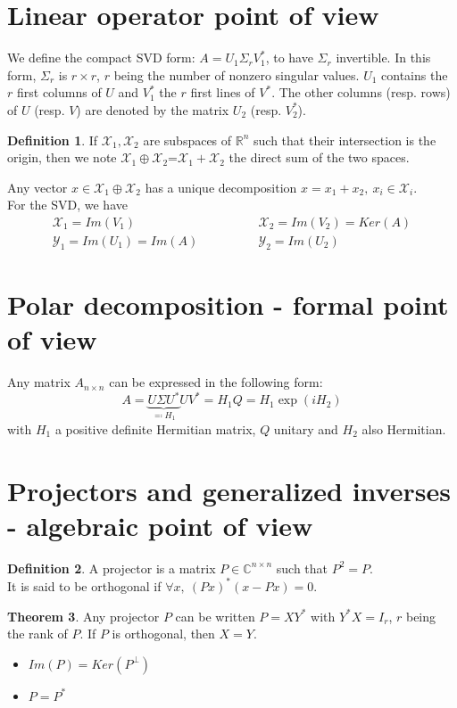 \documentclass[12pt, openany]{report}
\theoremstyle{definition}
\newtheorem{thm}{Theorem}[chapter]
\newtheorem{definition}[thm]{Definition}
\newcommand{\R}{\mathbb{R}}
\newcommand{\C}{\mathbb{C}}
\begin{document}
\section{Linear operator point of view}
We define the compact SVD form: \(A=U_1\Sigma_rV_1^*\), to have \(\Sigma_r\) invertible. In this form, \(\Sigma_r\) is \(r\times r\), \(r\) being the number of nonzero singular values. \(U_1\) contains the \(r\) first columns of \(U\) and \(V_1^*\) the \(r\) first lines of \(V^*\). The other columns (resp. rows) of \(U\) (resp. \(V\)) are denoted by the matrix \(U_2\) (resp. \(V_2^*\)). 
\begin{definition}
    If \(\mathcal{X}_1,\mathcal{X}_2\) are subspaces of \(\R^n\) such that their intersection is the origin, then we note \(\mathcal{X}_1\oplus \mathcal{X}_2\)=\(\mathcal{X}_1+\mathcal{X}_2\) the direct sum of the two spaces. 
\end{definition}
Any vector \(x\in \mathcal{X}_1\oplus \mathcal{X}_2\) has a unique decomposition \(x=x_1+x_2, \:x_i\in \mathcal{X}_i\). \\
For the SVD, we have 
\begin{align}
    \mathcal{X}_1 = Im(V_1) & \qquad \qquad \mathcal{X}_2 = Im(V_2) = Ker(A)\\
    \mathcal{Y}_1 = Im(U_1) = Im(A) &\qquad  \qquad \mathcal{Y}_2 = Im(U_2)
\end{align}
\section{Polar decomposition - formal point of view}
Any matrix \(A_{n\times n}\) can be expressed in the following form:
\begin{equation}
    A = \underbrace{U\Sigma U^*}_{\eqcolon H_1}UV^* = H_1Q = H_1\exp(iH_2)
\end{equation}
with \(H_1\) a positive definite Hermitian matrix, \(Q\) unitary and \(H_2\) also Hermitian.
\section{Projectors and generalized inverses - algebraic point of view}
\begin{definition}
    A projector is a matrix \(P\in \C^{n\times n}\) such that \(P^2=P\). \\
    It is said to be orthogonal if \(\forall x,\: (Px)^*(x-Px) = 0\). 
\end{definition}
\begin{thm}
    Any projector \(P\) can be written \(P=XY^*\) with \(Y^*X=I_r\), \(r\) being the rank of \(P\). If \(P\) is orthogonal, then \(X=Y\). 
\end{thm}
\begin{itemize}
    \item \(Im(P) = Ker(P^\perp)\)
    \item \(P=P^*\)
\end{itemize}
\end{document}
